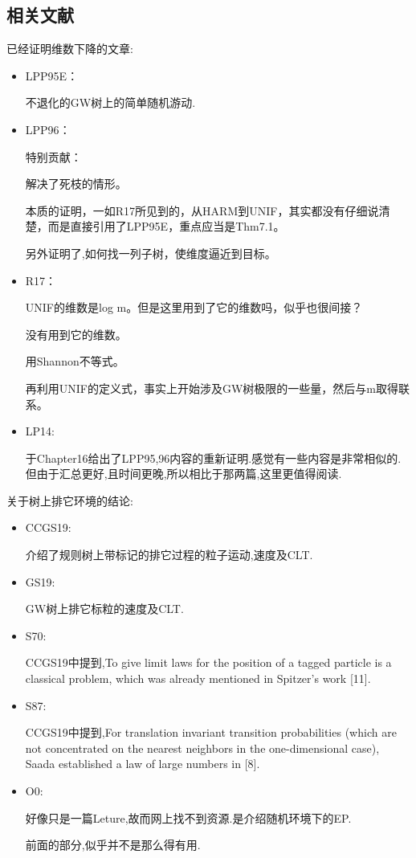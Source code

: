 \documentclass[a4paper,oneside]{ctexbook}
\begin{document}
    	\subsection*{相关文献}

			已经证明维数下降的文章:

			\begin{itemize}
				\item LPP95E\cite{LPP95E}：

					不退化的GW树上的简单随机游动.
				\item LPP96\cite{LPP96B}：

					特别贡献：

					解决了死枝的情形。

					本质的证明，一如R17所见到的，从HARM到UNIF，其实都没有仔细说清楚，而是直接引用了LPP95E，重点应当是Thm7.1。

					另外证明了,如何找一列子树，使维度逼近到目标。
				\item R17\cite{R17}：
				
					UNIF的维数是log m。但是这里用到了它的维数吗，似乎也很间接？

					没有用到它的维数。

					用Shannon不等式。

					再利用UNIF的定义式，事实上开始涉及GW树极限的一些量，然后与m取得联系。
				\item LP14\cite{LP14}:

					于Chapter16给出了LPP95,96内容的重新证明.感觉有一些内容是非常相似的.但由于汇总更好,且时间更晚,所以相比于那两篇,这里更值得阅读.
			\end{itemize}

			关于树上排它环境的结论:

			\begin{itemize}
			\item CCGS19\cite{CCGS19}:

				介绍了规则树上带标记的排它过程的粒子运动,速度及CLT.

			\item GS19\cite{GS19}:

				GW树上排它标粒的速度及CLT.

			\item S70\cite{S70}:

				CCGS19中提到,To give limit laws for the position of a tagged particle is a classical problem, which was already mentioned in Spitzer’s work [11].

			\item S87\cite{S87}:

				CCGS19中提到,For translation invariant transition probabilities (which are not concentrated on the nearest neighbors in the one-dimensional case), Saada established a law of large numbers in [8].

			\item O0:

				好像只是一篇Leture,故而网上找不到资源.是介绍随机环境下的EP.

				前面的部分,似乎并不是那么得有用.
			\end{itemize}
\end{document}
